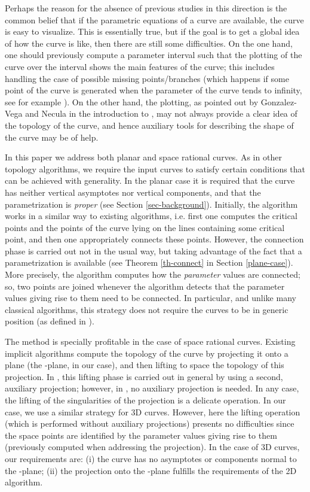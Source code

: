 \documentclass{elsart}
\begin{document}
Perhaps the reason for the absence of previous studies in this
direction is the common belief that if the parametric equations of
a curve are available, the curve is easy to visualize. This is
essentially true, but if the goal is to get a global idea of how
the curve is like, then there are still some difficulties. On the
one hand, one should previously compute a parameter interval such
that the plotting of the curve over the interval shows the main
features of the curve; this includes handling the case of possible
missing points/branches (which happens if some point of the curve
is generated when the parameter of the curve tends to infinity,
see for example \cite{Andradas}). On the other hand, the plotting,
as pointed out by Gonzalez-Vega and Necula in the introduction to
\cite{Lalo}, may not always provide a clear idea of the topology
of the curve, and hence auxiliary tools for describing the shape
of the curve may be of help.

In this paper we address both planar and space rational curves. As in other topology algorithms, we require the
input curves to satisfy certain conditions that can be achieved
with generality. In the planar case it is
required that the curve has neither vertical asymptotes nor
vertical components, and that the parametrization is {\it proper}
(see Section \ref{sec-background}). Initially,
the algorithm works in a similar way to existing
algorithms, i.e. first one computes the critical
points and the points of the curve lying on the lines 
containing some critical point, and then one
appropriately connects these points. However, the connection phase
is carried out not in the usual way, but taking
advantage of the fact that a  parametrization
 is available (see Theorem \ref{th-connect} in
Section \ref{plane-case}). More precisely, the algorithm computes how the {\it parameter} values are
connected; so, two points are joined whenever the
algorithm detects that the parameter values giving rise to them
need to be connected. In particular, and unlike many classical
algorithms, this strategy does not require the curves to be in generic position (as defined in \cite{Lalo}).



The method is specially profitable in the case of space rational
curves. Existing implicit algorithms compute the topology of the
curve by projecting it onto a plane (the -plane, in our case),
and then lifting to space the topology of this projection. In
\cite{JG-Sendra}, this lifting phase is carried out in general by
using a second, auxiliary projection; however, in \cite{Diat},
\cite{ElKa} no auxiliary projection is needed. In any case, the
lifting of the singularities of the projection is a delicate
operation. In our case, we use a similar strategy for 3D curves.
However, here the lifting operation (which is performed without
auxiliary projections) presents no difficulties since the space
points are identified by the parameter values giving rise to them
(previously computed when addressing the projection). In the case
of 3D curves, our requirements are: (i) the curve has no
asymptotes or components normal to the -plane; (ii) the
projection onto the -plane fulfills the requirements of the 2D
algorithm.
\end{document}
